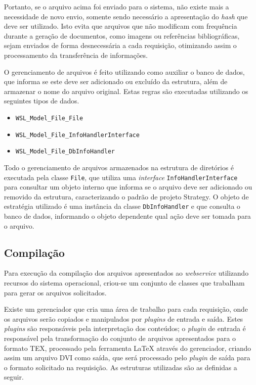 \documentclass{article}
\begin{document}
Portanto, se o arquivo acima foi enviado para o sistema, não existe mais a
necessidade de novo envio, somente sendo necessário a apresentação do
\emph{hash} que deve ser utilizado. Isto evita que arquivos que não modificam
com frequência durante a geração de documentos, como imagens ou referências
bibliográficas, sejam enviados de forma desnecessária a cada requisição,
otimizando assim o processamento da transferência de informações.

O gerenciamento de arquivos é feito utilizando como auxiliar o banco de dados,
que informa se este deve ser adicionado ou excluído da estrutura, além de
armazenar o nome do arquivo original. Estas regras são executadas utilizando os
seguintes tipos de dados.

\begin{itemize}
    \item \texttt{WSL\_Model\_File\_File}
    \item \texttt{WSL\_Model\_File\_InfoHandlerInterface}
    \item \texttt{WSL\_Model\_File\_DbInfoHandler}
\end{itemize}

Todo o gerenciamento de arquivos armazenados na estrutura de diretórios é
executada pela classe \texttt{File}, que utiliza uma \emph{interface}
\texttt{InfoHandlerInterface} para consultar um objeto interno que informa se o
arquivo deve ser adicionado ou removido da estrutura, caracterizando o padrão de
projeto Strategy. O objeto de estratégia utilizado é uma instância da classe
\texttt{DbInfoHandler} e que consulta o banco de dados, informando o objeto
dependente qual ação deve ser tomada para o arquivo.

\subsection{Compilação}

Para execução da compilação dos arquivos apresentados ao \emph{webservice}
utilizando recursos do sistema operacional, criou-se um conjunto de classes que
trabalham para gerar os arquivos solicitados.

Existe um gerenciador que cria uma área de trabalho para cada requisição, onde
os arquivos serão copiados e manipulados por \emph{plugins} de entrada e saída.
Estes \emph{plugins} são responsáveis pela interpretação dos conteúdos; o
\emph{plugin} de entrada é responsável pela transformação do conjunto de
arquivos apresentados para o formato TEX, processado pela ferramenta \LaTeX{}
através do gerenciador, criando assim um arquivo DVI como saída, que será
processado pelo \emph{plugin} de saída para o formato solicitado na requisição.
As estruturas utilizadas são as definidas a seguir.
\end{document}
